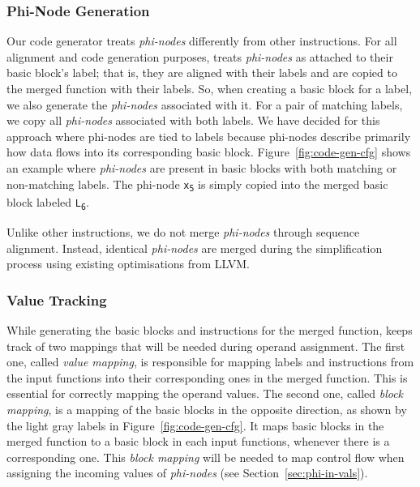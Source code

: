 \subsubsection{Phi-Node Generation}

Our code generator treats \textit{phi-nodes} differently from other instructions. For all alignment and code generation purposes,
{\ProjName} treats \textit{phi-nodes} as attached to their basic block's label; that is, they are aligned with their labels and are
copied to the merged function with their labels. So, when creating a basic block for a label, we also generate the \textit{phi-nodes}
associated with it. For a pair of matching labels, we copy all \textit{phi-nodes} associated with both labels.
We have decided for this approach where phi-nodes are tied to labels because phi-nodes describe primarily how data flows into its corresponding basic block.
Figure~\ref{fig:code-gen-cfg} shows an example where \textit{phi-nodes} are present in basic blocks
with both matching or non-matching labels.
The phi-node \texttt{x\textsubscript{5}} is simply copied into the merged basic block labeled \texttt{L\textsubscript{6}}.

Unlike other instructions, we do not merge \textit{phi-nodes} through sequence alignment.
Instead, identical \textit{phi-nodes} are merged during the simplification process
using existing optimisations from LLVM.

\subsubsection{Value Tracking}

While generating the basic blocks and instructions for the merged function,
{\ProjName} keeps track of two mappings that will be needed during operand assignment.
The first one, called \textit{value mapping}, is responsible for mapping labels
and instructions from the input functions into their corresponding ones in the merged
function.
This is essential for correctly mapping the operand values.
The second one, called \textit{block mapping}, is a mapping of the basic blocks
in the opposite direction, as shown by the light gray labels in Figure~\ref{fig:code-gen-cfg}.
It maps basic blocks in the merged function to a basic block in each input functions,
whenever there is a corresponding one.
This \textit{block mapping} will be needed to map control flow when assigning the
incoming values of \textit{phi-nodes} (see Section~\ref{sec:phi-in-vals}).

